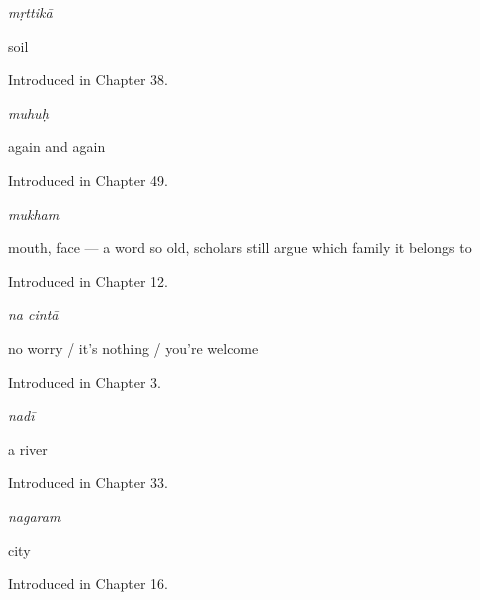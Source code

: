 \noindent\begin{minipage}[t]{\linewidth}
\raggedright
\textbf{}\enspace\emph{mṛttikā}\par
\small soil\par
\footnotesize Introduced in Chapter 38.
\end{minipage}\par\medskip

\noindent\begin{minipage}[t]{\linewidth}
\raggedright
\textbf{}\enspace\emph{muhuḥ}\par
\small again and again\par
\footnotesize Introduced in Chapter 49.
\end{minipage}\par\medskip

\noindent\begin{minipage}[t]{\linewidth}
\raggedright
\textbf{}\enspace\emph{mukham}\par
\small mouth, face — a word so old, scholars still argue which family it belongs to\par
\footnotesize Introduced in Chapter 12.
\end{minipage}\par\medskip

\noindent\begin{minipage}[t]{\linewidth}
\raggedright
\textbf{ }\enspace\emph{na cintā}\par
\small no worry / it's nothing / you're welcome\par
\footnotesize Introduced in Chapter 3.
\end{minipage}\par\medskip

\noindent\begin{minipage}[t]{\linewidth}
\raggedright
\textbf{}\enspace\emph{nadī}\par
\small a river\par
\footnotesize Introduced in Chapter 33.
\end{minipage}\par\medskip

\noindent\begin{minipage}[t]{\linewidth}
\raggedright
\textbf{}\enspace\emph{nagaram}\par
\small city\par
\footnotesize Introduced in Chapter 16.
\end{minipage}\par\medskip

